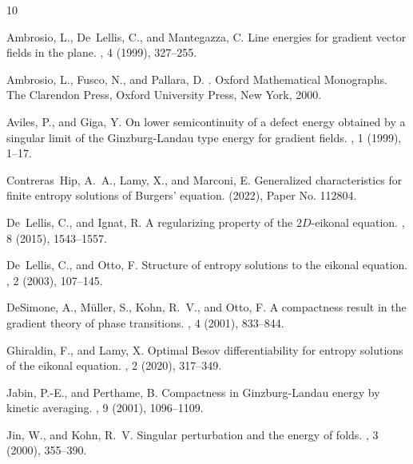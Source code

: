 \documentclass[fleqn
]{article}
\numberwithin{equation}{section}
\theoremstyle{definition}
\begin{document}
\begin{thebibliography}{10}

{\sc Ambrosio, L., De~Lellis, C., and Mantegazza, C.}
\newblock Line energies for gradient vector fields in the plane.
, 4 (1999),
  327--255.

{\sc Ambrosio, L., Fusco, N., and Pallara, D.}
.
\newblock Oxford Mathematical Monographs. The Clarendon Press, Oxford
  University Press, New York, 2000.

{\sc Aviles, P., and Giga, Y.}
\newblock On lower semicontinuity of a defect energy obtained by a singular
  limit of the {G}inzburg-{L}andau type energy for gradient fields.
, 1 (1999), 1--17.

{\sc Contreras~Hip, A.~A., Lamy, X., and Marconi, E.}
\newblock Generalized characteristics for finite entropy solutions of
  {B}urgers' equation.
 (2022), Paper No. 112804.

{\sc De~Lellis, C., and Ignat, R.}
\newblock A regularizing property of the {$2D$}-eikonal equation.
, 8 (2015), 1543--1557.

{\sc De~Lellis, C., and Otto, F.}
\newblock Structure of entropy solutions to the eikonal equation.
, 2 (2003), 107--145.

{\sc DeSimone, A., M{\"u}ller, S., Kohn, R.~V., and Otto, F.}
\newblock A compactness result in the gradient theory of phase transitions.
, 4 (2001), 833--844.

{\sc Ghiraldin, F., and Lamy, X.}
\newblock Optimal {Besov} differentiability for entropy solutions of the
  eikonal equation.
, 2 (2020), 317--349.

{\sc Jabin, P.-E., and Perthame, B.}
\newblock Compactness in {G}inzburg-{L}andau energy by kinetic averaging.
, 9 (2001), 1096--1109.

{\sc Jin, W., and Kohn, R.~V.}
\newblock Singular perturbation and the energy of folds.
, 3 (2000), 355--390.


\end{thebibliography}
\end{document}
